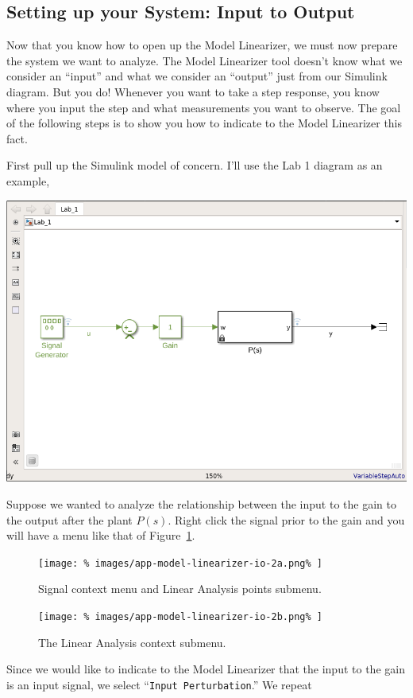 \subsection{Setting up your System: Input to Output}
Now that you know how to open up the Model Linearizer, we must now prepare
the system we want to analyze. The Model Linearizer tool doesn't know what
we consider an ``input'' and what we consider an ``output'' just from our
Simulink diagram. But you do! Whenever you want to take a step response, you
know where you input the step and what measurements you want to observe.
The goal of the following steps is to show you how to indicate to the
Model Linearizer this fact.

First pull up the Simulink model of concern. I'll use the Lab 1 diagram as
an example,
%
\begin{center}
  \includegraphics[width=0.8\linewidth]{images/app-model-linearizer-io-1.png}
\end{center}
%
Suppose we wanted to analyze the relationship between the input to the gain
to the output after the plant \(P(s).\) Right click the signal prior to the
gain and you will have a menu like that of Figure~\ref{fig:app1:io-menu:a}.
%
\begin{figure}
  \centering
  \texttt{[image: \%
    images/app-model-linearizer-io-2a.png\%
  ]}
  \caption{Signal context menu and Linear Analysis points submenu.}
  \label{fig:app1:io-menu:a}
\end{figure}
%
\begin{figure}
  \centering
  \texttt{[image: \%
    images/app-model-linearizer-io-2b.png\%
  ]}
  \caption{The Linear Analysis context submenu.}
  \label{fig:app1:io-menu:b}
\end{figure}
%
Since we would like to indicate to the Model Linearizer that the input to the
gain is an input signal, we select ``\texttt{Input Perturbation}.'' We repeat
